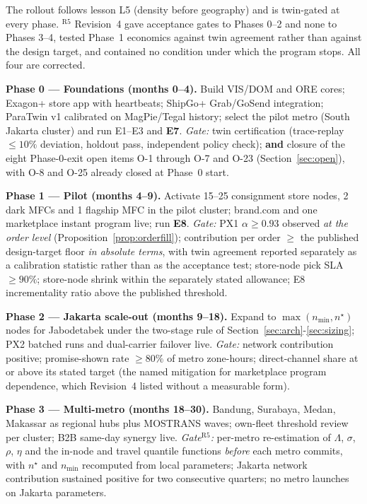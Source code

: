 \documentclass[10pt,twocolumn,letterpaper]{article}
\theoremstyle{definition}
\begin{document}
The rollout follows lesson L5 (density before geography) and is twin-gated at every phase. $^{\mathrm{R5}}$ Revision~4 gave acceptance gates to Phases 0--2 and none to Phases 3--4, tested Phase~1 economics against twin agreement rather than against the design target, and contained no condition under which the program stops. All four are corrected.

\textbf{Phase 0 --- Foundations (months 0--4).} Build VIS/DOM and ORE cores; Exagon+ store app with heartbeats; ShipGo+ Grab/GoSend integration; ParaTwin v1 calibrated on MagPie/Tegal history; select the pilot metro (South Jakarta cluster) and run E1--E3 and \textbf{E7}.
\emph{Gate:} twin certification (trace-replay $\le10\%$ deviation, holdout pass, independent policy check); \textbf{and} closure of the eight Phase-0-exit open items O-1 through O-7 and O-23 (Section~\ref{sec:open}), with O-8 and O-25 already closed at Phase~0 start.

\textbf{Phase 1 --- Pilot (months 4--9).} Activate 15--25 consignment store nodes, 2 dark MFCs and 1 flagship MFC in the pilot cluster; brand.com and one marketplace instant program live; run \textbf{E8}.
\emph{Gate:} PX1 $\alpha\ge0.93$ observed \emph{at the order level} (Proposition~\ref{prop:orderfill}); contribution per order $\ge$ the published design-target floor \emph{in absolute terms}, with twin agreement reported separately as a calibration statistic rather than as the acceptance test; store-node pick SLA $\ge90\%$; store-node shrink within the separately stated allowance; E8 incrementality ratio above the published threshold.

\textbf{Phase 2 --- Jakarta scale-out (months 9--18).} Expand to $\max(n_{\min},n^\star)$ nodes for Jabodetabek under the two-stage rule of Section~\ref{sec:arch}-\ref{sec:sizing}; PX2 batched runs and dual-carrier failover live.
\emph{Gate:} network contribution positive; promise-shown rate $\ge80\%$ of metro zone-hours; direct-channel share at or above its stated target (the named mitigation for marketplace program dependence, which Revision~4 listed without a measurable form).

\textbf{Phase 3 --- Multi-metro (months 18--30).} Bandung, Surabaya, Medan, Makassar as regional hubs plus MOSTRANS waves; own-fleet threshold review per cluster; B2B same-day synergy live.
\emph{Gate}$^{\mathrm{R5}}$\emph{:} per-metro re-estimation of $\Lambda$, $\sigma$, $\rho$, $\eta$ and the in-node and travel quantile functions \emph{before} each metro commits, with $n^\star$ and $n_{\min}$ recomputed from local parameters; Jakarta network contribution sustained positive for two consecutive quarters; no metro launches on Jakarta parameters.
\end{document}
